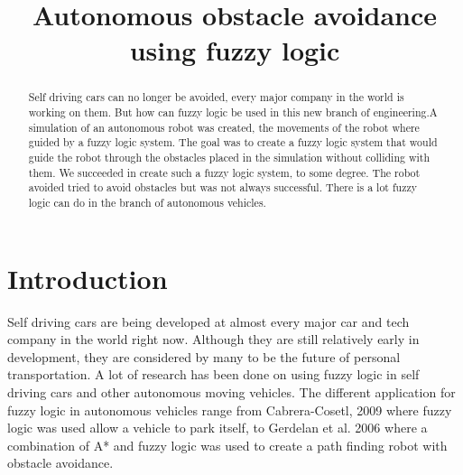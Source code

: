 \documentclass[conference]{IEEEtran}
\begin{document}
%
\title{Autonomous obstacle avoidance using fuzzy logic}


\author{
\and
{}
\and 
{}
}

\date{}


\maketitle




\begin{abstract}
  Self driving cars can no longer be avoided, every major company in the world is working on them. But how can fuzzy logic be used in this new branch of engineering.A simulation of an autonomous robot was created, the movements of the robot where guided by a fuzzy logic system. The goal was to create a fuzzy logic system that would guide the robot through the obstacles placed in the simulation without colliding with them. We succeeded in create such a fuzzy logic system, to some degree. The robot avoided tried to avoid obstacles but was not always successful. There is a lot fuzzy logic can do in the branch of autonomous vehicles.
\end{abstract}
\section{Introduction}
Self driving cars are being developed at almost every major car and tech company in the world right now. Although they are still relatively early in development, they are considered by many to be the future of personal transportation. A lot of research has been done on using fuzzy logic in self driving cars and other autonomous moving vehicles. The different application for fuzzy logic in autonomous vehicles range from Cabrera-Cosetl, 2009 \cite{Cabrera2009} where fuzzy logic was used allow a vehicle to park itself, to Gerdelan et al. 2006 \cite{gerdelan2006novel} where a combination of A* and fuzzy logic was used to create a path finding robot with obstacle avoidance.
\end{document}
